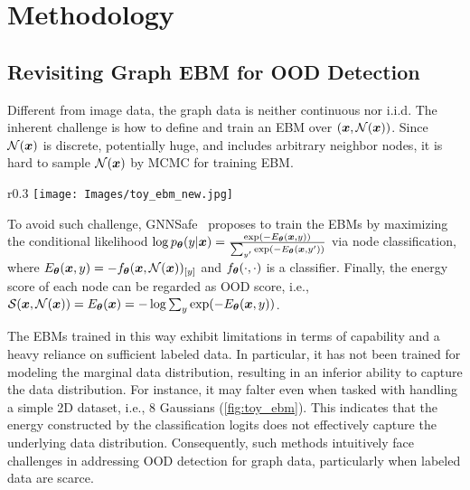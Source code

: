 \section{Methodology}
\subsection{Revisiting Graph EBM for OOD Detection}
\vspace{-2mm}
Different from image data, the graph data is neither continuous nor i.i.d. The inherent challenge is how to define and train an EBM over $({\bm{x}},\mathcal{N}({\bm{x}}))$. 
Since $\mathcal{N}({\bm{x}})$ is discrete, potentially huge, and includes arbitrary neighbor nodes, it is hard to sample $\mathcal{N}({\bm{x}})$ by MCMC for training EBM.

\begin{wrapfigure}[12]{r}{0.3\textwidth}
\vspace{-4.5mm}
  \centering
  \texttt{[image: Images/toy\_ebm\_new.jpg]}
  \vspace{-10pt}
  \caption{Visualization comparison on 2D data.}
  \label{fig:toy_ebm}
\end{wrapfigure}

To avoid such challenge, GNNSafe~\citep{wu2023gnnsafe} proposes to train the EBMs by maximizing the conditional likelihood $\log p_{\bm{\theta}}(y|{\bm{x}}) = \tfrac{\exp(-E_{{\bm{\theta}}}({\bm{x}},y))}{\sum_{y'} \exp(-E_{{\bm{\theta}}}({\bm{x}}, y'))}$ via node classification, where $E_{{\bm{\theta}}}({\bm{x}},y) = -f_{{\bm{\theta}}}({\bm{x}}, \mathcal{N}({\bm{x}}))_{[y]}$ and $f_{{\bm{\theta}}}(\cdot, \cdot)$ is a classifier. 
Finally, the energy score of each node can be regarded as OOD score, i.e., $\mathcal{S}({\bm{x}}, \mathcal{N}({\bm{x}})) = E_{{\bm{\theta}}}({\bm{x}})=-\log \sum_y \exp(-E_{{\bm{\theta}}}({\bm{x}},y))$.

The EBMs trained in this way exhibit limitations in terms of capability and a heavy reliance on sufficient labeled data. In particular, it has not been trained for modeling the marginal data distribution, resulting in an inferior ability to capture the data distribution.
For instance, it may falter even when tasked with handling a simple 2D dataset, i.e., 8 Gaussians  (\cref{fig:toy_ebm}). This indicates that the energy constructed by the classification logits does not effectively capture the underlying data distribution. Consequently, such methods intuitively face challenges in addressing OOD detection for graph data, particularly when labeled data are scarce.




